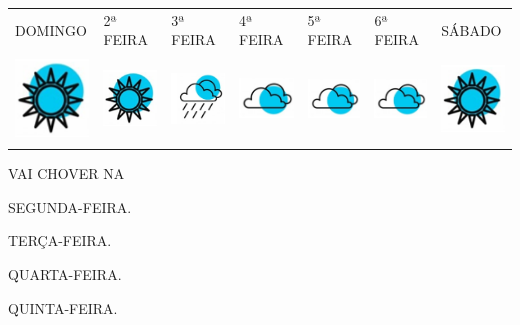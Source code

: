 \noindent{}\begin{tabular}{lllllll}
DOMINGO & 2ª FEIRA & 3ª FEIRA & 4ª FEIRA & 5ª FEIRA & 6ª FEIRA & SÁBADO \\
\includegraphics[width=0.85429in,height=0.89596in]{media/image136.png} & \includegraphics[width=0.85429in,height=0.89596in]{media/image136.png} & \includegraphics[width=0.85429in,height=0.89596in]{media/image138.png} & \includegraphics[width=0.88247in,height=0.64865in]{media/image137.png} & \includegraphics[width=0.81068in,height=0.59588in]{media/image137.png} & \includegraphics[width=0.81068in,height=0.59588in]{media/image137.png} & \includegraphics[width=0.77289in,height=0.73191in]{media/image136.png}
\end{tabular}

VAI CHOVER NA

\begin{escolha}
\item SEGUNDA-FEIRA.

\item TERÇA-FEIRA.

\item QUARTA-FEIRA.

\item QUINTA-FEIRA.
\end{escolha}

